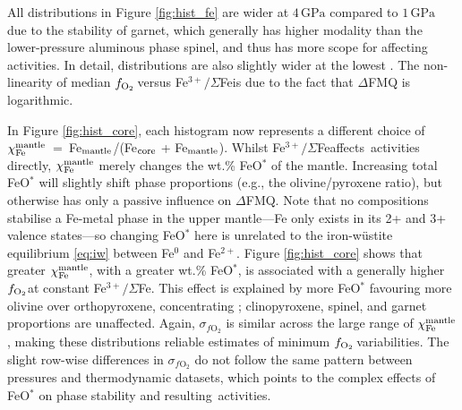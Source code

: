 \documentclass[fleqn,usenatbib,twocolumn]{mnras}
\newcommand{\fo}{$f_{\ce{O2}}$}
\newcommand{\ferric}{\ce{Fe^{3+}}}
\newcommand{\xfer}{Fe$^{3+}/\Sigma$Fe}
\newcommand{\xcore}{Fe$_{\rm mantle}$/(Fe$_{\rm core}$ + Fe$_{\rm mantle}$)}
\newcommand{\todo}[1]{\textit{\textcolor{violet}{{#1}}}}
\begin{document}
All distributions in Figure \ref{fig:hist_fe} are wider at $4\,\text{GPa}$ compared to $1\,\text{GPa}$ due to the stability of garnet, which generally has higher modality than the lower-pressure aluminous phase spinel, and thus has more scope for affecting \ferric\,activities. In detail, distributions are also slightly wider at the lowest \ferric. The non-linearity of median \fo\,versus \xfer\;is due to the fact that $\Delta$FMQ is logarithmic.%



In Figure \ref{fig:hist_core}, each histogram now represents a different choice of $\chi_{\rm Fe}^{\rm mantle}$~=~\xcore. Whilst \xfer\;affects \ferric\,activities directly, $\chi_{\rm Fe}^{\rm mantle}$ merely changes the wt.\% FeO$^*$ of the mantle. Increasing total FeO$^*$ will slightly shift phase proportions (e.g., the olivine/pyroxene ratio), but otherwise has only a passive influence on $\Delta$FMQ. Note that no compositions stabilise a Fe-metal phase in the upper mantle---Fe only exists in its 2+ and 3+ valence states---so changing FeO$^*$ here is unrelated to the iron-w\"ustite equilibrium \eqref{eq:iw} between Fe$^0$ and Fe$^{2+}$. Figure \ref{fig:hist_core} shows that greater $\chi_{\rm Fe}^{\rm mantle}$, with a greater wt.\% FeO$^*$, is associated with a generally higher \fo at constant \xfer. This effect is explained by more FeO$^*$ favouring more olivine over orthopyroxene, concentrating \ferric; clinopyroxene, spinel, and garnet proportions are unaffected. Again, $\sigma_{f\text{O}_2}$ is similar across the large range of $\chi_{\rm Fe}^{\rm mantle}$, making these distributions reliable estimates of minimum \fo\,variabilities. The slight row-wise differences in $\sigma_{f\text{O}_2}$ do not follow the same pattern between pressures and thermodynamic datasets, which points to the complex effects of FeO$^*$ on phase stability and resulting \ferric\,activities.%

\end{document}
